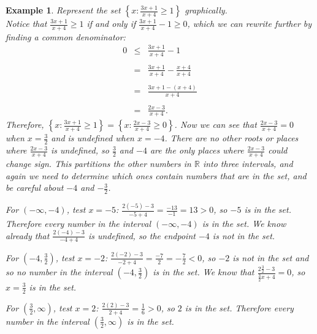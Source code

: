 \documentclass[11pt]{book}               %
\newtheorem{example}{Example}
\begin{document}
\begin{example} 
{ Represent the set $\left\{x:\frac{3x+1}{x+4} \geq 1\right\}$ graphically.} \\

\normalfont
Notice that $\frac{3x+1}{x+4} \geq 1$ if and only if $\frac{3x+1}{x+4} -1 \geq 0$, which we can rewrite further by finding a common denominator:
    $$
    \begin{array}{rcl}
     0  & \leq &    \frac{3x+1}{x+4} -1 \\ \\
        & =&        \frac{3x+1}{x+4} - \frac{x+4}{x+4}  \\ \\
        &=&     \frac{3x+1 - (x+4)}{x+4}    \\ \\
        &=&     \frac{2x-3}{x+4}.
    \end{array}
    $$
Therefore, $\left\{x:\frac{3x+1}{x+4} \geq 1\right\} = \left\{x:\frac{2x-3}{x+4} \geq 0 \right\}$.
Now we can see that $\frac{2x-3}{x+4}=0$ when $x=\frac{3}{2}$ and is undefined when $x=-4$. There are no other roots or places where $\frac{2x-3}{x+4}$ is undefined, so $\frac{3}{2}$ and $-4$ are the only places where $\frac{2x-3}{x+4}$ could change sign. This partitions the other numbers in $\mathbb{R}$ into three intervals, and again we need to determine which ones contain numbers that are in the set, and be careful about $-4$ and $-\frac{3}{2}$.

For $(-\infty, -4)$, test $x = -5$:  $\frac{2(-5)-3}{-5+4}=\frac{-13}{-1}=13>0$, so $-5$ is in the set. 
Therefore every number in the interval $(-\infty,-4)$ is in the set.
We know already that $\frac{2(-4)-3}{-4+4}$ is undefined, so the endpoint $-4$ is not in the set.

For $(-4, \frac{3}{2})$, test $x = -2$:  $\frac{2(-2)-3}{-2+4}=\frac{-7}{2}=-\frac{7}{2}<0$, so $-2$ is not in the set and so no number in the interval $\left(-4,\frac{3}{2}\right)$ is in the set.
We know that $\frac{2\frac{3}{2}-3}{\frac{3}{2}x+4}=0$, so $x=\frac{3}{2}$ is in the set.

For $(\frac{3}{2}, \infty)$, test $x = 2$: $\frac{2(2)-3}{2+4}=\frac{1}{6}>0$, so $2$ is in the set.
Therefore every number in the interval $\left(\frac{3}{2},\infty\right)$ is in the set. 


\end{example}
\end{document}
